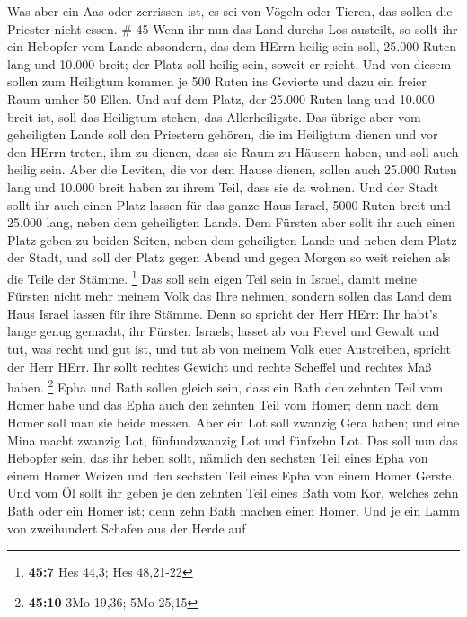  Was aber ein Aas oder zerrissen ist, es sei von Vögeln
oder Tieren, das sollen die Priester nicht essen. \# 45 
Wenn ihr nun das Land durchs Los austeilt, so sollt ihr ein Hebopfer vom
Lande absondern, das dem HErrn heilig sein soll, 25.000 Ruten lang und
10.000 breit; der Platz soll heilig sein, soweit er reicht. 
Und von diesem sollen zum Heiligtum kommen je 500 Ruten ins Gevierte und
dazu ein freier Raum umher 50 Ellen.  Und auf dem Platz, der
25.000 Ruten lang und 10.000 breit ist, soll das Heiligtum stehen, das
Allerheiligste.  Das übrige aber vom geheiligten Lande soll
den Priestern gehören, die im Heiligtum dienen und vor den HErrn treten,
ihm zu dienen, dass sie Raum zu Häusern haben, und soll auch heilig
sein.  Aber die Leviten, die vor dem Hause dienen, sollen
auch 25.000 Ruten lang und 10.000 breit haben zu ihrem Teil, dass sie da
wohnen.  Und der Stadt sollt ihr auch einen Platz lassen für
das ganze Haus Israel, 5000 Ruten breit und 25.000 lang, neben dem
geheiligten Lande.  Dem Fürsten aber sollt ihr auch einen
Platz geben zu beiden Seiten, neben dem geheiligten Lande und neben dem
Platz der Stadt, und soll der Platz gegen Abend und gegen Morgen so weit
reichen als die Teile der Stämme. \footnote{\textbf{45:7} Hes 44,3; Hes
  48,21-22}  Das soll sein eigen Teil sein in Israel, damit
meine Fürsten nicht mehr meinem Volk das Ihre nehmen, sondern sollen das
Land dem Haus Israel lassen für ihre Stämme.  Denn so
spricht der Herr HErr: Ihr habt's lange genug gemacht, ihr Fürsten
Israels; lasset ab von Frevel und Gewalt und tut, was recht und gut ist,
und tut ab von meinem Volk euer Austreiben, spricht der Herr HErr.
 Ihr sollt rechtes Gewicht und rechte Scheffel und rechtes
Maß haben. \footnote{\textbf{45:10} 3Mo 19,36; 5Mo 25,15} 
Epha und Bath sollen gleich sein, dass ein Bath den zehnten Teil vom
Homer habe und das Epha auch den zehnten Teil vom Homer; denn nach dem
Homer soll man sie beide messen.  Aber ein Lot soll zwanzig
Gera haben; und eine Mina macht zwanzig Lot, fünfundzwanzig Lot und
fünfzehn Lot.  Das soll nun das Hebopfer sein, das ihr
heben sollt, nämlich den sechsten Teil eines Epha von einem Homer Weizen
und den sechsten Teil eines Epha von einem Homer Gerste. 
Und vom Öl sollt ihr geben je den zehnten Teil eines Bath vom Kor,
welches zehn Bath oder ein Homer ist; denn zehn Bath machen einen Homer.
 Und je ein Lamm von zweihundert Schafen aus der Herde auf
